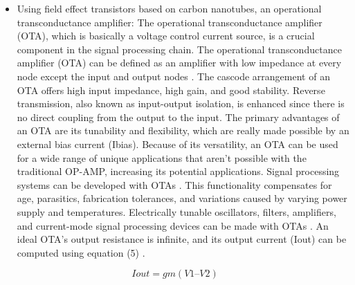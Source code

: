 \begin{itemize}
  \item Using field effect transistors based on carbon nanotubes, an operational
  transconductance amplifier: The operational transconductance amplifier (OTA),
  which is basically a voltage control current source, is a crucial component in
  the signal processing chain. The operational transconductance amplifier (OTA)
  can be defined as an amplifier with low impedance at every node except the
  input and output nodes \cite{ref1,ref2}. The cascode arrangement of an OTA
  offers high input impedance, high gain, and good stability. Reverse
  transmission, also known as input-output isolation, is enhanced since there is
  no direct coupling from the output to the input. The primary advantages of an
  OTA are its tunability and flexibility, which are really made possible by an
  external bias current (Ibias). Because of its versatility, an OTA can be used
  for a wide range of unique applications that aren't possible with the
  traditional OP-AMP, increasing its potential applications. Signal processing
  systems can be developed with OTAs \cite{ref5}. This functionality compensates
  for age, parasitics, fabrication tolerances, and variations caused by varying
  power supply and temperatures. Electrically tunable oscillators, filters,
  amplifiers, and current-mode signal processing devices can be made with OTAs
  \cite{ref24}. An ideal OTA's output resistance is infinite, and its output
  current (Iout) can be computed using equation (5) \cite{ref2}.
\end{itemize}

\begin{equation}
  Iout = gm (V1 – V2)
  \label{eq:5}
\end{equation}

